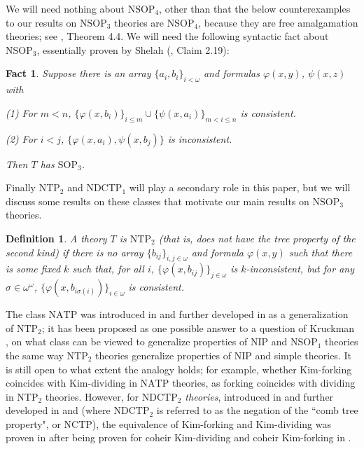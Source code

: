 \documentclass[12pt]{amsart}
\newtheorem{fact}[theorem]{Fact}
\newtheorem{definition}{Definition}[section]
\theoremstyle{definition}
\begin{document}
We will need nothing about $\mathrm{NSOP}_{4}$, other than that the below counterexamples to our results on $\mathrm{NSOP}_{3}$ theories are $\mathrm{NSOP}_{4}$, because they are free amalgamation theories; see \cite{Co15}, Theorem 4.4. We will need the following syntactic fact about $\mathrm{NSOP}_{3}$, essentially proven by Shelah (\cite{She95}, Claim 2.19):

\begin{fact}\label{4-sop3fact}
    Suppose there is an array $\{a_{i}, b_{i}\}_{i < \omega}$ and formulas $\varphi(x, y)$, $\psi(x, z)$ with

    (1) For $m < n$, $\{\varphi(x, b_{i})\}_{i \leq m} \cup \{\psi(x, a_{i})\}_{m < i \leq n}$ is consistent.

    (2) For $ i < j$, $\{\varphi(x, a_{i}), \psi(x, b_{j})\}$ is inconsistent.

    Then $T$ has $\mathrm{SOP}_{3}$.
\end{fact}

Finally $\mathrm{NTP}_{2}$ and $\mathrm{NDCTP}_{1}$ will play a secondary role in this paper, but we will discuss some results on these classes that motivate our main results on $\mathrm{NSOP}_{3}$ theories.

\begin{definition}
A theory $T$ is $\mathrm{NTP}_{2}$ (that is, does not have the \emph{tree property of the second kind}) if there is no array $\{b_{ij}\}_{i, j \in \omega}$ and formula $\varphi(x, y)$ such that there is some fixed $k$ such that, for all $i$, $\{\varphi(x, b_{ij})\}_{j \in \omega}$ is $k$-inconsistent, but for any $\sigma \in \omega^{\omega}$, $\{\varphi(x, b_{i\sigma(i)})\}_{i \in \omega}$ is consistent.
\end{definition}

The class $\mathrm{NATP}$ was introduced in \cite{AK20} and further developed in \cite{AK21} as a generalization of $\mathrm{NTP}_{2}$; it has been proposed as one possible answer to a question of Kruckman \cite{Kr}, on what class can be viewed to generalize properties of $\mathrm{NIP}$ and $\mathrm{NSOP}_{1}$ theories the same way $\mathrm{NTP}_{2}$ theories generalize properties of $\mathrm{NIP}$ and simple theories. It is still open to what extent the analogy holds; for example, whether Kim-forking coincides with Kim-dividing in $\mathrm{NATP}$ theories, as forking coincides with dividing in $\mathrm{NTP}_{2}$ theories. However, for \textit{$\mathrm{NDCTP}_{2}$ theories}, introduced in \cite{NSOP2} and further developed in \cite{KL22} and \cite{Hanson23} (where $\mathrm{NDCTP}_{2}$ is referred to as the negation of the ``comb tree property", or $\mathrm{NCTP}$), the equivalence of Kim-forking and Kim-dividing was proven in \cite{KL22} after being proven for coheir Kim-dividing and coheir Kim-forking in \cite{NSOP2}.
\end{document}
